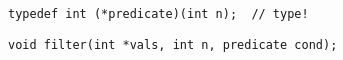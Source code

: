 \begin{frame}[fragile]{}
  \begin{lstlisting}[style = Cstyle]
  typedef int (*predicate)(int n);	// type!
  \end{lstlisting}

  \pause

  \begin{lstlisting}[style = Cstyle]
  void filter(int *vals, int n, predicate cond);
  \end{lstlisting}

  \pause
  \vspace{0.30cm}
  \centerline{\large {}}

\end{frame}
